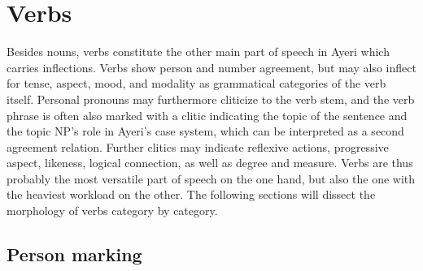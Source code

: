 \section{Verbs}
\label{sec:verbs}

Besides nouns, verbs constitute the other main part of speech in Ayeri which
carries inflections. Verbs show person and number agreement, but may also
inflect for tense, aspect, mood, and modality as grammatical categories of the
verb itself. Personal pronouns may furthermore cliticize to the verb stem, and
the verb phrase is often also marked with a clitic indicating the topic of the
sentence and the topic NP's role in Ayeri's case system, which can be
interpreted as a second agreement relation. Further clitics may indicate
reflexive actions, progressive aspect, likeness, logical connection, as well
as degree and measure. Verbs are thus probably the most versatile part of
speech on the one hand, but also the one with the heaviest workload on the
other. The following sections will dissect the morphology of verbs category by
category.

\subsection{Person marking}
\label{subsec:persnumagr}

